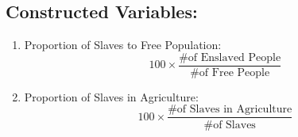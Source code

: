 \documentclass[11pt]{article}
\begin{document}
\subsection{Constructed Variables:}

\begin{enumerate}
  \item Proportion of Slaves to Free Population:
  $$ 100 \times \frac{\text{\# of Enslaved People}}{\text{\# of Free People}} $$

  \item Proportion of Slaves in Agriculture:
  $$ 100 \times \frac{\text{\# of Slaves in Agriculture}}{\text{\# of Slaves}}$$

\end{enumerate}
\end{document}
